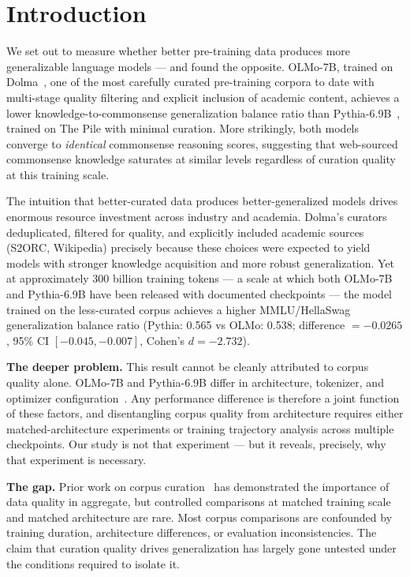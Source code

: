 \section{Introduction}

We set out to measure whether better pre-training data produces more generalizable language models --- and found the opposite. OLMo-7B, trained on Dolma~\cite{Soldaini2024Dolma}, one of the most carefully curated pre-training corpora to date with multi-stage quality filtering and explicit inclusion of academic content, achieves a lower knowledge-to-commonsense generalization balance ratio than Pythia-6.9B~\cite{Biderman2023Pythia}, trained on The Pile with minimal curation. More strikingly, both models converge to \textit{identical} commonsense reasoning scores, suggesting that web-sourced commonsense knowledge saturates at similar levels regardless of curation quality at this training scale.

The intuition that better-curated data produces better-generalized models drives enormous resource investment across industry and academia. Dolma's curators deduplicated, filtered for quality, and explicitly included academic sources (S2ORC, Wikipedia) precisely because these choices were expected to yield models with stronger knowledge acquisition and more robust generalization. Yet at approximately 300 billion training tokens --- a scale at which both OLMo-7B and Pythia-6.9B have been released with documented checkpoints --- the model trained on the less-curated corpus achieves a higher MMLU/HellaSwag generalization balance ratio (Pythia: 0.565 vs OLMo: 0.538; difference $= -0.0265$, 95\% CI $[-0.045, -0.007]$, Cohen's $d = -2.732$).

\textbf{The deeper problem.} This result cannot be cleanly attributed to corpus quality alone. OLMo-7B and Pythia-6.9B differ in architecture, tokenizer, and optimizer configuration~\cite{Groeneveld2024OLMo,Biderman2023Pythia}. Any performance difference is therefore a joint function of these factors, and disentangling corpus quality from architecture requires either matched-architecture experiments or training trajectory analysis across multiple checkpoints. Our study is not that experiment --- but it reveals, precisely, why that experiment is necessary.

\textbf{The gap.} Prior work on corpus curation~\cite{Penedo2023RefinedWeb,Soldaini2024Dolma,Muennighoff2023Scaling} has demonstrated the importance of data quality in aggregate, but controlled comparisons at matched training scale and matched architecture are rare. Most corpus comparisons are confounded by training duration, architecture differences, or evaluation inconsistencies. The claim that curation quality drives generalization has largely gone untested under the conditions required to isolate it.

